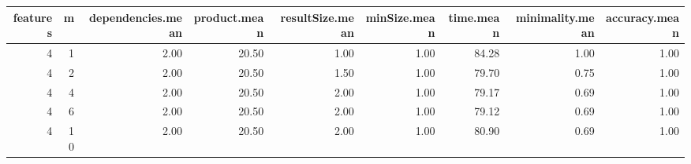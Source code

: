 \begin{table}[ht]
\centering
\begin{tabular}{rrrrrrrrr}
  \hline
features & m & dependencies.mean & product.mean & resultSize.mean & minSize.mean & time.mean & minimality.mean & accuracy.mean \\ 
  \hline
  4 &   1 & 2.00 & 20.50 & 1.00 & 1.00 & 84.28 & 1.00 & 1.00 \\ 
    4 &   2 & 2.00 & 20.50 & 1.50 & 1.00 & 79.70 & 0.75 & 1.00 \\ 
    4 &   4 & 2.00 & 20.50 & 2.00 & 1.00 & 79.17 & 0.69 & 1.00 \\ 
    4 &   6 & 2.00 & 20.50 & 2.00 & 1.00 & 79.12 & 0.69 & 1.00 \\ 
    4 &  10 & 2.00 & 20.50 & 2.00 & 1.00 & 80.90 & 0.69 & 1.00 \\ 
   \hline
\end{tabular}
\end{table}
